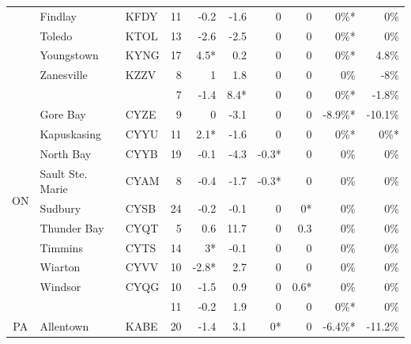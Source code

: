 \documentclass[twocol]{ametsoc}
\begin{document}
\begin{landscape}
\begin{table}[]
\begin{tabular}{@{}cllrrrrrrr@{}}
                     & Findlay                    & KFDY & 11   & -0.2  & -1.6  & 0     & 0    & 0\%*    & 0\%      \\
                     & Toledo                     & KTOL & 13   & -2.6  & -2.5  & 0     & 0    & 0\%*    & 0\%      \\
                     & Youngstown                 & KYNG & 17   & 4.5*  & 0.2   & 0     & 0    & 0\%*    & 4.8\%    \\
                     & Zanesville                 & KZZV & 8    & 1     & 1.8   & 0     & 0    & 0\%     & -8\%     \\ \cmidrule(l){2-10} 
                     &                            &      & 7    & -1.4  & 8.4*  & 0     & 0    & 0\%*    & -1.8\%   \\ \midrule
\multirow{9}{*}{ON}  & Gore Bay                   & CYZE & 9    & 0     & -3.1  & 0     & 0    & -8.9\%* & -10.1\%  \\
                     & Kapuskasing                & CYYU & 11   & 2.1*  & -1.6  & 0     & 0    & 0\%*    & 0\%*     \\
                     & North Bay                  & CYYB & 19   & -0.1  & -4.3  & -0.3* & 0    & 0\%     & 0\%      \\
                     & Sault Ste. Marie           & CYAM & 8    & -0.4  & -1.7  & -0.3* & 0    & 0\%     & 0\%      \\
                     & Sudbury                    & CYSB & 24   & -0.2  & -0.1  & 0     & 0*   & 0\%     & 0\%      \\
                     & Thunder Bay                & CYQT & 5    & 0.6   & 11.7  & 0     & 0.3  & 0\%     & 0\%      \\
                     & Timmins                    & CYTS & 14   & 3*    & -0.1  & 0     & 0    & 0\%     & 0\%      \\
                     & Wiarton                    & CYVV & 10   & -2.8* & 2.7   & 0     & 0    & 0\%     & 0\%      \\
                     & Windsor                    & CYQG & 10   & -1.5  & 0.9   & 0     & 0.6* & 0\%     & 0\%      \\ \cmidrule(l){2-10} 
                     &                            &      & 11   & -0.2  & 1.9   & 0     & 0    & 0\%*    & 0\%      \\ \midrule
\multirow{9}{*}{PA}  & Allentown                  & KABE & 20   & -1.4  & 3.1   & 0*    & 0    & -6.4\%* & -11.2\%  \\

\end{tabular}
\end{table}
\end{landscape}
\end{document}

